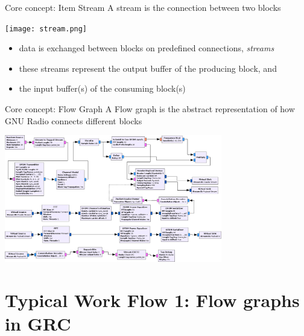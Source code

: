 \documentclass{beamer}
\begin{document}
\begin{frame}{Core concept: Item Stream}
  A stream is the connection between two blocks

  \texttt{[image: stream.png]}\centering

  \begin{itemize}
    \item data is exchanged between blocks on predefined connections, \emph{streams}
    \item these streams represent the output buffer of the producing block, and
    \item the input buffer(s) of the consuming block(s)
  \end{itemize}
\end{frame}


\begin{frame}{Core concept: Flow Graph}
  A Flow graph is the abstract representation of how GNU Radio connects different blocks


  \includegraphics[height=15em]{rxofdm.png}

\end{frame}

\section{Typical Work Flow 1: Flow graphs in GRC}
\end{document}
